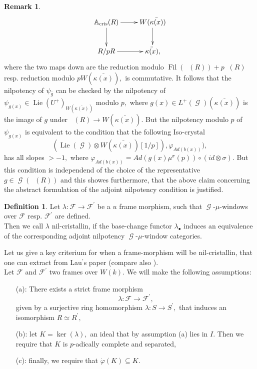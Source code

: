 \documentclass[a4paper,10,5 pt]{amsart}
\theoremstyle{definition}
\newtheorem{Definition}{Definition}
\newtheorem{Remark}{Remark}
\DeclareMathOperator{\Lie}{Lie}
\DeclareMathOperator{\Acris}{\mathbb{A}_{cris}}
\DeclareMathOperator{\Fil}{Fil}
\DeclareMathOperator{\G}{\mathcal{G}}
\begin{document}
\begin{Remark}
$$
\xymatrix{
\Acris(R) \ar[r] \ar[d] & W(\bar{\kappa(x)}) \ar[d] \\
R/pR \ar[r] & \bar{\kappa(x)},
}
$$
where the two maps down are the reduction modulo $\Fil(\Acris(R))+p\Acris(R)$ resp. reduction modulo $pW(\bar{\kappa(x)}),$ is commutative. It follows that the nilpotency of $\psi_{\bar{g}}$ can be checked by the nilpotency of $\psi_{g(x)}\in \Lie(U^{+})_{W(\bar{\kappa(x)})}$ modulo $p,$ where $g(x)\in L^{+}(\G)(\bar{\kappa(x)})$ is the image of $g$ under $\Acris(R)\rightarrow W(\bar{\kappa(x)}).$ But the nilpotency modulo $p$ of $\psi_{g(x)}$ is equivalent to the condition that the following Iso-crystal
$$
(\Lie(\G)\otimes W(\bar{\kappa(x)})[1/p]),\varphi_{Ad(b(x))}),
$$
has all slopes $>-1,$ where $\varphi_{Ad(b(x))}=Ad(g(x)\mu^{\sigma}(p))\circ (id\otimes \sigma).$ But this condition is independend of the choice of the representative $g\in \G(\Acris(R))$ and this showes furthermore, that the above claim concerning the abstract formulation of the adjoint nilpotency condition is justified.
\end{Remark}
\begin{Definition}
Let $\lambda\colon \mathcal{F}\rightarrow \mathcal{F}^{\prime}$ be a $u$ frame morphism, such that $\G$-$\mu$-windows over $\mathcal{F}$ resp. $\mathcal{F}^{\prime}$ are defined.
\\
Then we call $\lambda$ nil-cristallin, if the base-change functor $\lambda_{\bullet}$ induces an equivalence of the corresponding adjoint nilpotency $\G$-$\mu$-window categories.
\end{Definition}
Let us give a key criterium for when a frame-morphism will be nil-cristallin, that one can extract from Lau$^{\prime}$s paper \cite{h-frame} (compare also \cite[Theorem 3.5.4.]{BP}).
\\
Let $\mathcal{F}$ and $\mathcal{F}^{\prime}$ two frames over $W(k)$.
We will make the following assumptions:
\begin{enumerate}
\item[(a):] There exists a strict frame morphism
$$\lambda\colon \mathcal{F}\rightarrow \mathcal{F}^{\prime},$$
given by a surjective ring homomorphism $\lambda\colon S\rightarrow S^{\prime},$ that induces an isomorphism $R\simeq R^{\prime},$
\item[(b):] let $K=\ker(\lambda),$ an ideal that by assumption (a) lies in $I.$ Then we require that $K$ is $p$-adically complete and separated,
\item[(c):] finally, we require that $\dot{\varphi}(K)\subseteq K.$
\end{enumerate}
\end{document}
